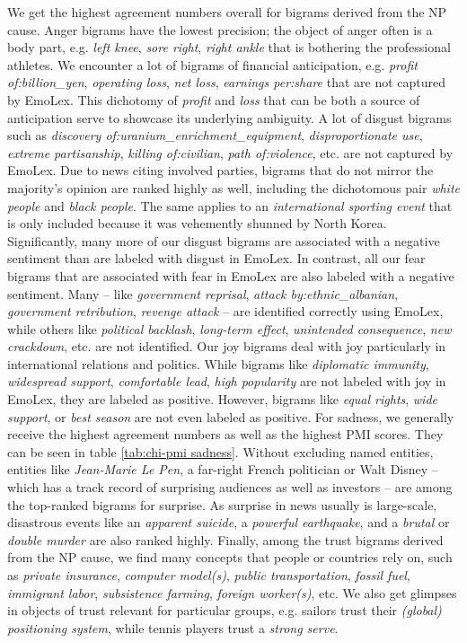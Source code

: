 We get the highest agreement numbers overall for bigrams derived from the NP cause. Anger bigrams have the lowest precision; the object of anger often is a body part, e.g. \textit{left knee}, \textit{sore right}, \textit{right ankle} that is bothering the professional athletes. We encounter a lot of bigrams of financial anticipation, e.g. \textit{profit of:billion\_yen}, \textit{operating loss}, \textit{net loss}, \textit{earnings per:share} that are not captured by EmoLex. This dichotomy of \textit{profit} and \textit{loss} that can be both a source of anticipation serve to showcase its underlying ambiguity.
A lot of disgust bigrams such as \textit{discovery of:uranium\_enrichment\_equipment}, \textit{disproportionate use}, \textit{extreme partisanship}, \textit{killing of:civilian}, \textit{path of:violence}, etc. are not captured by EmoLex. Due to news citing involved parties, bigrams that do not mirror the majority's opinion are ranked highly as well, including the dichotomous pair \textit{white people} and \textit{black people}. The same applies to an \textit{international sporting event} that is only included because it was vehemently shunned by North Korea. Significantly, many more of our disgust bigrams are associated with a negative sentiment than are labeled with disgust in EmoLex.
In contrast, all our fear bigrams that are associated with fear in EmoLex are also labeled with a negative sentiment. Many -- like \textit{government reprisal}, \textit{attack by:ethnic\_albanian}, \textit{government retribution}, \textit{revenge attack} -- are identified correctly using EmoLex, while others like \textit{political backlash}, \textit{long-term effect}, \textit{unintended consequence}, \textit{new crackdown}, etc. are not identified.
Our joy bigrams deal with joy particularly in international relations and politics. While bigrams like \textit{diplomatic immunity}, \textit{widespread support}, \textit{comfortable lead}, \textit{high popularity} are not labeled with joy in EmoLex, they are labeled as positive. However, bigrams like \textit{equal rights}, \textit{wide support}, or \textit{best season} are not even labeled as positive.
For sadness, we generally receive the highest agreement numbers as well as the highest PMI scores. They can be seen in table \ref{tab:chi-pmi sadness}.
Without excluding named entities, entities like \textit{Jean-Marie Le Pen}, a far-right French politician or Walt Disney -- which has a track record of surprising audiences as well as investors -- are among the top-ranked bigrams for surprise. As surprise in news usually is large-scale, disastrous events like an \textit{apparent suicide}, a \textit{powerful earthquake}, and a \textit{brutal} or \textit{double murder} are also ranked highly.
Finally, among the trust bigrams derived from the NP cause, we find many concepts that people or countries rely on, such as \textit{private insurance}, \textit{computer model(s)}, \textit{public transportation}, \textit{fossil fuel}, \textit{immigrant labor}, \textit{subsistence farming}, \textit{foreign worker(s)}, etc. We also get glimpses in objects of trust relevant for particular groups, e.g. sailors trust their \textit{(global) positioning system}, while tennis players trust a \textit{strong serve}.


